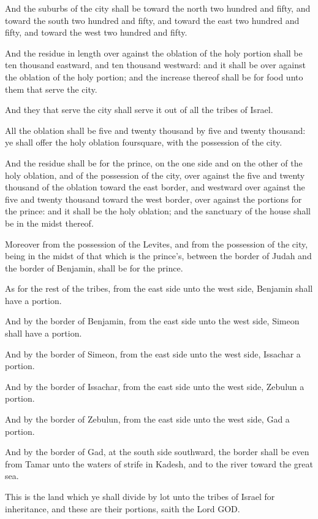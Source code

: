 \Verse And the suburbs of the city shall be toward the north two hundred and fifty, and toward the south two hundred and fifty, and toward the east two hundred and fifty, and toward the west two hundred and fifty.

\Verse And the residue in length over against the oblation of the holy portion shall be ten thousand eastward, and ten thousand westward: and it shall be over against the oblation of the holy portion; and the increase thereof shall be for food unto them that serve the city.

\Verse And they that serve the city shall serve it out of all the tribes of Israel.

\Verse All the oblation shall be five and twenty thousand by five and twenty thousand: ye shall offer the holy oblation foursquare, with the possession of the city.

\Verse And the residue shall be for the prince, on the one side and on the other of the holy oblation, and of the possession of the city, over against the five and twenty thousand of the oblation toward the east border, and westward over against the five and twenty thousand toward the west border, over against the portions for the prince: and it shall be the holy oblation; and the sanctuary of the house shall be in the midst thereof.

\Verse Moreover from the possession of the Levites, and from the possession of the city, being in the midst of that which is the prince's, between the border of Judah and the border of Benjamin, shall be for the prince.

\Verse As for the rest of the tribes, from the east side unto the west side, Benjamin shall have a portion.

\Verse And by the border of Benjamin, from the east side unto the west side, Simeon shall have a portion.

\Verse And by the border of Simeon, from the east side unto the west side, Issachar a portion.

\Verse And by the border of Issachar, from the east side unto the west side, Zebulun a portion.

\Verse And by the border of Zebulun, from the east side unto the west side, Gad a portion.

\Verse And by the border of Gad, at the south side southward, the border shall be even from Tamar unto the waters of strife in Kadesh, and to the river toward the great sea.

\Verse This is the land which ye shall divide by lot unto the tribes of Israel for inheritance, and these are their portions, saith the Lord GOD.

